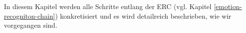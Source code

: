 

In diesem Kapitel werden alle Schritte entlang der ERC (vgl. Kapitel \ref{emotion-recogniton-chain}) konkretisiert und es wird detailreich beschrieben, wie wir vorgegangen sind. \\










